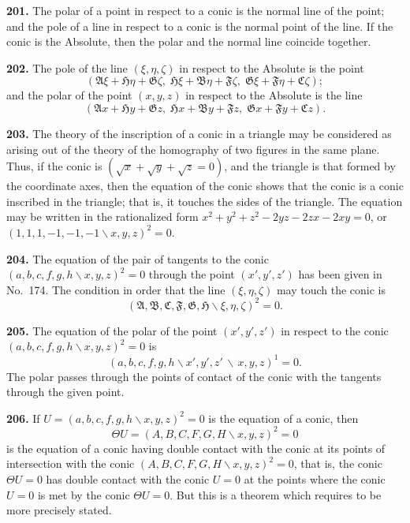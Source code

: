 \documentclass[11pt,a4paper]{book}
\begin{document}
\begin{center}
\textbf{201.} The polar of a point in respect to a conic is the normal line of the point;
and the pole of a line in respect to a conic is the normal point of the line. If the conic
is the Absolute, then the polar and the normal line coincide together.

\textbf{202.} The pole of the line $(\xi,\eta,\zeta)$ in respect to the Absolute is the point
\[
(\mathfrak{A}\xi+\mathfrak{H}\eta+\mathfrak{G}\zeta,\; \mathfrak{H}\xi+\mathfrak{B}\eta+\mathfrak{F}\zeta,\; \mathfrak{G}\xi+\mathfrak{F}\eta+\mathfrak{C}\zeta);
\]
and the polar of the point $(x,y,z)$ in respect to the Absolute is the line
\[
(\mathfrak{A}x+\mathfrak{H}y+\mathfrak{G}z,\; \mathfrak{H}x+\mathfrak{B}y+\mathfrak{F}z,\; \mathfrak{G}x+\mathfrak{F}y+\mathfrak{C}z).
\]

\textbf{203.} The theory of the inscription of a conic in a triangle may be considered
as arising out of the theory of the homography of two figures in the same plane.
Thus, if the conic is $(\sqrt{x}+\sqrt{y}+\sqrt{z}=0)$, and the triangle is that formed by the
coordinate axes, then the equation of the conic shows that the conic is a conic
inscribed in the triangle; that is, it touches the sides of the triangle. The equation
may be written in the rationalized form $x^2+y^2+z^2-2yz-2zx-2xy=0$, or
$(1,1,1,-1,-1,-1\!\backslash x,y,z)^2=0$.

\textbf{204.} The equation of the pair of tangents to the conic $(a,b,c,f,g,h\!\backslash x,y,z)^2=0$
through the point $(x',y',z')$ has been given in No.~174. The condition in order
that the line $(\xi,\eta,\zeta)$ may touch the conic is
\[
(\mathfrak{A},\mathfrak{B},\mathfrak{C},\mathfrak{F},\mathfrak{G},\mathfrak{H}\!\backslash \xi,\eta,\zeta)^2 = 0.
\]

\textbf{205.} The equation of the polar of the point $(x',y',z')$ in respect to the conic
$(a,b,c,f,g,h\!\backslash x,y,z)^2=0$ is
\[
(a,b,c,f,g,h\!\backslash x',y',z'\,\backslash\,x,y,z)^1 = 0.
\]
The polar passes through the points of contact of the conic with the tangents through
the given point.

\textbf{206.} If $U=(a,b,c,f,g,h\!\backslash x,y,z)^2=0$ is the equation of a conic, then
\[
\Theta U = (A,B,C,F,G,H\!\backslash x,y,z)^2 = 0
\]
is the equation of a conic having double contact with the conic at its points
of intersection with the conic $(A,B,C,F,G,H\!\backslash x,y,z)^2=0$, that is, the conic $\Theta U=0$
has double contact with the conic $U=0$ at the points where the conic $U=0$ is met
by the conic $\Theta U=0$. But this is a theorem which requires to be more precisely
stated.


\end{center}
\end{document}
